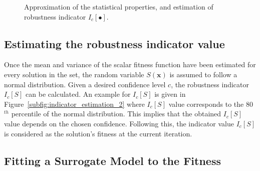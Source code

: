\documentclass{llncs}
\newcommand{\brr}[1]{{\left({#1}\right)}} %
\newcommand{\Ic}[1]{I_c\!\left[{#1}\right]} %
\newcommand{\vx}{\mathbf{x}} %
\begin{document}
\begin{figure}
\centering
{}
\hspace{1mm}
\caption{Approximation of the statistical properties, and estimation of robustness indicator $\Ic{\bullet}$.}
\label{fig:indicator_estimation}
\end{figure}

\subsection{Estimating the robustness indicator value}\label{subsec:robustness indicators}

Once the mean and variance of the scalar fitness function have been estimated for every solution in the set, the random variable $S\brr{\vx}$ is assumed to follow a normal distribution. Given a desired confidence level $c$, the robustness indicator $\Ic{S}$ can be calculated. An example for $\Ic{S}$ is given in Figure~\ref{subfig:indicator_estimation_2} where $\Ic{S}$ value corresponds to the 80$^{th}$ percentile of the normal distribution. This implies that the obtained $\Ic{S}$ value depends on the chosen confidence. Following this, the indicator value $\Ic{S}$ is considered as the solution's fitness at the current iteration.

\subsection{Fitting a Surrogate Model to the Fitness}\label{subsec:Kriging}
\end{document}
